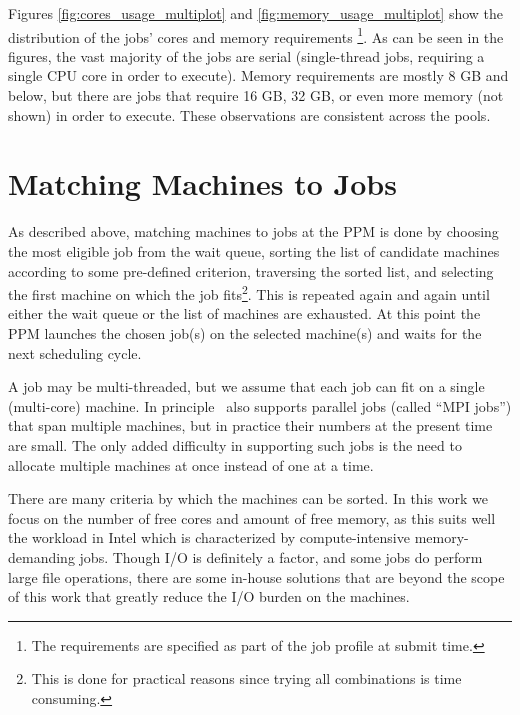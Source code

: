 Figures \ref{fig:cores_usage_multiplot} and \ref{fig:memory_usage_multiplot}
show the distribution of the jobs' cores and memory requirements
\footnote{The requirements are specified as part of the job profile at submit time.}.
As can be seen in the figures, the vast majority of the jobs are
serial (single-thread jobs, requiring a single CPU core in order to execute).
Memory requirements are mostly 8 GB and below, but there are jobs that
require 16 GB, 32 GB, or even more memory (not shown) in order to
execute.
These observations are consistent across the pools.



\chapter{Matching Machines to Jobs}
\label{sec:matching}

As described above, matching machines to jobs at the PPM is done by
choosing the most eligible job from the wait queue, sorting the list
of candidate machines according to some pre-defined criterion,
traversing the sorted list, and selecting the first machine on which
the job fits\footnote{This is done for practical reasons since trying
  all combinations is time consuming.}.
This is repeated again and again until either the wait queue or the
list of machines are exhausted.
At this point the PPM launches the chosen job(s) on the selected
machine(s) and waits for the next scheduling cycle.

A job may be multi-threaded, but we assume that each job can fit on a
single (multi-core) machine.
In principle \nb\ also supports parallel jobs (called ``MPI jobs'')
that span multiple machines, but in practice their numbers at the
present time are small.
The only added difficulty in supporting such jobs is the need to
allocate multiple machines at once instead of one at a time.

There are many criteria by which the machines can be sorted.
In this work we focus on the number of free cores and amount of free
memory, as this suits well the workload in Intel which is
characterized by compute-intensive memory-demanding jobs.
Though I/O is definitely a factor, and some jobs do perform large file
operations, there are some in-house solutions that are beyond the
scope of this work that greatly reduce the I/O burden on the
machines.


